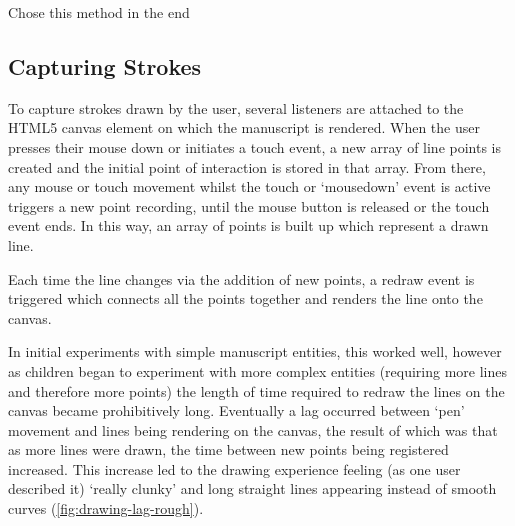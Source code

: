 Chose this method in the end


\subsection{Capturing Strokes}
\label{sec:capturing-strokes}
To capture strokes drawn by the user, several listeners are attached to the HTML5 canvas element on which the manuscript is rendered. When the user presses their mouse down or initiates a touch event, a new array of line points is created and the initial point of interaction is stored in that array. From there, any mouse or touch movement whilst the touch or `mousedown' event is active triggers a new point recording, until the mouse button is released or the touch event ends. In this way, an array of points is built up which represent a drawn line.

Each time the line changes via the addition of new points, a redraw event is triggered which connects all the points together and renders the line onto the canvas.

In initial experiments with simple manuscript entities, this worked well, however as children began to experiment with more complex entities (requiring more lines and therefore more points) the length of time required to redraw the lines on the canvas became prohibitively long. Eventually a lag occurred between `pen' movement and lines being rendering on the canvas, the result of which was that as more lines were drawn, the time between new points being registered increased. This increase led to the drawing experience feeling (as one user described it) `really clunky' and long straight lines appearing instead of smooth curves (\cref{fig:drawing-lag-rough}).

